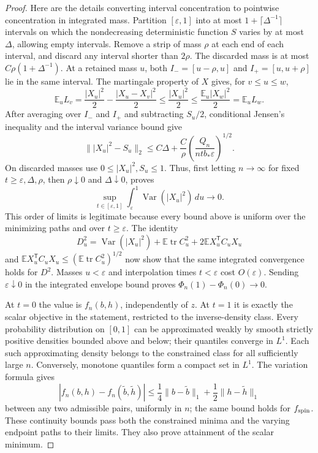 \begin{proof}
Here are the details converting interval concentration to pointwise
concentration in integrated mass. Partition $[\varepsilon,1]$
into at most $1+\lceil\Delta^{-1}\rceil$ intervals on which the
nondecreasing deterministic function $S$ varies by at most
$\Delta$, allowing empty intervals. Remove a strip of mass
$\rho$ at each end of each interval, and discard any interval
shorter than $2\rho$. The discarded mass is at most
$C\rho(1+\Delta^{-1})$. At a retained mass $u$, both
$I_-=[u-\rho,u]$ and $I_+=[u,u+\rho]$ lie in the same interval.
The martingale property of $X$ gives, for $v\le u\le w$,
\[
 \mathbb E_u L_v
   =\frac{|X_u|^2}{2}-\frac{|X_u-X_v|^2}{2}
   \le\frac{|X_u|^2}{2}
   \le\frac{\mathbb E_u|X_w|^2}{2}
   =\mathbb E_u L_w.
\]
After averaging over $I_-$ and $I_+$ and subtracting $S_u/2$,
conditional Jensen's inequality and the interval variance bound give
\[
 \bigl\||X_u|^2-S_u\bigr\|_2
 \le C\Delta+\frac C\rho
                   \left(\frac{Q_n}{ntb_*\varepsilon}\right)^{1/2}.
\]
On discarded masses use $0\le|X_u|^2,S_u\le1$. Thus, first
letting $n\to\infty$ for fixed $t\ge\varepsilon,\Delta,\rho$,
then $\rho\downarrow0$ and $\Delta\downarrow0$, proves
\[
 \sup_{t\in[\varepsilon,1]}
 \int_\varepsilon^1\operatorname{Var}(|X_u|^2)\,du\longrightarrow0.
\]
This order of limits is legitimate because every bound above is
uniform over the minimizing paths and over $t\ge\varepsilon$.
The identity
\[
 D_u^2=\operatorname{Var}(|X_u|^2)
       +\mathbb E\operatorname{tr}C_u^2
       +2\mathbb E X_u^{\mathsf T}C_uX_u
\]
and $\mathbb E X_u^{\mathsf T}C_uX_u
\le(\mathbb E\operatorname{tr}C_u^2)^{1/2}$ now show that the
same integrated convergence holds for $D^2$. Masses $u<\varepsilon$
and interpolation times $t<\varepsilon$ cost $O(\varepsilon)$.
Sending $\varepsilon\downarrow0$ in the integrated envelope bound
proves $\Phi_n(1)-\Phi_n(0)\to0$.

At $t=0$ the value is $f_n(b,h)$, independently of $z$. At $t=1$
it is exactly the scalar objective in the statement, restricted to
the inverse-density class. Every probability distribution on $[0,1]$
can be approximated weakly by smooth strictly positive densities
bounded above and below; their quantiles converge in $L^1$.
Each such approximating density belongs to the constrained class
for all sufficiently large $n$. Conversely, monotone quantiles form
a compact set in $L^1$. The variation formula gives
\[
 |f_n(b,h)-f_n(\widetilde b,\widetilde h)|
 \le\frac14\|b-\widetilde b\|_1
      +\frac12\|h-\widetilde h\|_1
\]
between any two admissible pairs, uniformly in $n$; the same bound
holds for $f_{\rm spin}$. These continuity bounds pass both the
constrained minima and the varying endpoint paths to their limits.
They also prove attainment of the scalar minimum.
\end{proof}

